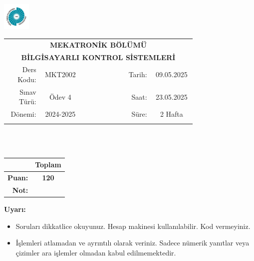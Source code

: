 \newcommand\UniversiteAdi{Niğde Ömer Halisdemir Üniversitesi}
\newcommand\BolumAdi{MEKATRONİK BÖLÜMÜ}
\newcommand\DersKodu{MKT2002}
\newcommand\DersAdi{BİLGİSAYARLI KONTROL SİSTEMLERİ}
\newcommand\SinavAdi{Ödev 4}
\newcommand\SinavTarihi{09.05.2025}
\newcommand\SinavSaati{23.05.2025}
\newcommand\SinavSuresi{2 Hafta}

\pagestyle{fancy}
\fancyhf{} %
\noindent \includegraphics[width=0.1\textwidth]{logo}
\begin{tabular}{
    p{0.15\linewidth}
    p{0.15\linewidth}
    p{0.2\linewidth}
    p{0.1\linewidth}
    p{0.15\linewidth}}
    \multicolumn{5}{c}{\textbf{\BolumAdi}}\\
    \multicolumn{5}{c}{\textbf{\DersAdi}}\\\hline
    \multicolumn{1}{|r|}{Ders Kodu:}&
    \multicolumn{1}{|c|}{\DersKodu}&
    \multicolumn{1}{|c|}{}& 
    \multicolumn{1}{|r|}{Tarih:}&
    \multicolumn{1}{|c|}{\SinavTarihi} \\\hline
    \multicolumn{1}{|r|}{Sınav Türü:}&
    \multicolumn{1}{|c|}{\SinavAdi}&  
    \multicolumn{1}{|c|}{}&
    \multicolumn{1}{|r|}{Saat:}&
    \multicolumn{1}{|c|}{\SinavSaati}\\\hline
    \multicolumn{1}{|r|}{Dönemi:}&
    \multicolumn{1}{|c|}{2024-2025}&
    \multicolumn{1}{|c|}{}&
    \multicolumn{1}{|r|}{Süre:}&
    \multicolumn{1}{|c|}{\SinavSuresi} \\\hline
    &&&&\\
\end{tabular}\\\\
\noindent\begin{center}
\begin{tabular}{|r|c|}\hline
    &\textbf{Toplam}\\\hline
    \textbf{Puan:} &\textbf{120}\\\hline
    \textbf{Not:}  &\\\hline
\end{tabular}\end{center}
\noindent\textbf{Uyarı:}
\begin{itemize}\bfseries
    \item Soruları dikkatlice okuyunuz. Hesap makinesi kullanılabilir. Kod vermeyiniz.
    \item İşlemleri atlamadan ve ayrıntılı olarak veriniz. Sadece nümerik yanıtlar veya çizimler ara işlemler olmadan kabul edilmemektedir.
\end{itemize}
